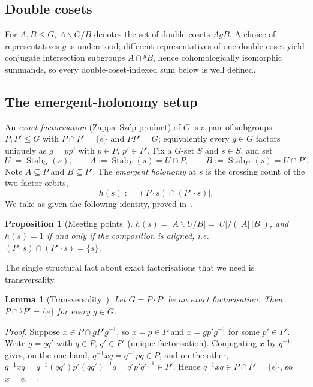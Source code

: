 \documentclass[11pt]{amsart}
\theoremstyle{plain}
\newtheorem{proposition}[theorem]{Proposition}
\newtheorem{lemma}[theorem]{Lemma}
\theoremstyle{definition}
\DeclareMathOperator{\Stab}{Stab}
\newcommand{\conj}[2]{{}^{#1}\!#2}
\newcommand{\dcoset}[3]{#1\backslash #2/#3}
\begin{document}
\subsection{Double cosets}
For $A,B\le G$, $\dcoset{A}{G}{B}$ denotes the set of double cosets $AgB$. A choice of
representatives $g$ is understood; different representatives of one double coset yield
conjugate intersection subgroups $A\cap\conj{g}{B}$, hence cohomologically isomorphic
summands, so every double-coset-indexed sum below is well defined.

\subsection{The emergent-holonomy setup}\label{ss:holonomy-setup}
An \emph{exact factorisation} (Zappa--Sz\'ep product) of $G$ is a pair of subgroups
$P,P'\le G$ with $P\cap P'=\{e\}$ and $PP'=G$; equivalently every $g\in G$ factors
uniquely as $g=pp'$ with $p\in P$, $p'\in P'$. Fix a $G$-set $S$ and $s\in S$, and set
\[
   U:=\Stab_G(s), \qquad A:=\Stab_P(s)=U\cap P, \qquad B:=\Stab_{P'}(s)=U\cap P'.
\]
Note $A\subseteq P$ and $B\subseteq P'$. The \emph{emergent holonomy} at $s$ is the
crossing count of the two factor-orbits,
\[
   h(s):=\bigl\lvert (P\cdot s)\cap(P'\cdot s)\bigr\rvert.
\]
We take as given the following identity, proved in~\cite{macbeth-meeting}.

\begin{proposition}[Meeting points~\cite{macbeth-meeting}]\label{prop:meeting}
$h(s)=\lvert\dcoset{A}{U}{B}\rvert=\lvert U\rvert/(\lvert A\rvert\,\lvert B\rvert)$, and
$h(s)=1$ if and only if the composition is aligned, i.e.\ $(P\cdot s)\cap(P'\cdot s)=\{s\}$.
\end{proposition}

The single structural fact about exact factorisations that we need is transversality.

\begin{lemma}[Transversality~\cite{macbeth-meeting}]\label{lem:transverse}
Let $G=P\cdot P'$ be an exact factorisation. Then $P\cap\conj{g}{P'}=\{e\}$ for every
$g\in G$.
\end{lemma}

\begin{proof}
Suppose $x\in P\cap gP'g^{-1}$, so $x=p\in P$ and $x=gp'g^{-1}$ for some $p'\in P'$.
Write $g=qq'$ with $q\in P$, $q'\in P'$ (unique factorisation). Conjugating $x$ by
$q^{-1}$ gives, on the one hand, $q^{-1}xq=q^{-1}pq\in P$, and on the other,
$q^{-1}xq=q^{-1}(qq')p'(qq')^{-1}q=q'p'q'^{-1}\in P'$. Hence
$q^{-1}xq\in P\cap P'=\{e\}$, so $x=e$.
\end{proof}
\end{document}
